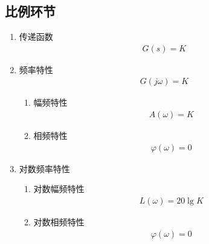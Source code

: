 \subsection{比例环节}
\begin{enumerate}[1.]
	\item 传递函数
	\vspace*{-0.5em}
	\begin{align}
		G(s) = K
	\end{align}
	\vspace*{-3em}
	
	\item 频率特性
	\vspace*{-0.5em}
	\begin{align}
		G(j\omega) = K
	\end{align}
	\vspace*{-3em}
	\begin{enumerate}[(1) ]
		\item 幅频特性
		\vspace*{-0.5em}
		\begin{align}
			A(\omega) = K
		\end{align}
		\vspace*{-3em}
		
		\item 相频特性
		\vspace*{-0.5em}
		\begin{align}
			\varphi(\omega) = 0
		\end{align}
		\vspace*{-3em}
	\end{enumerate}
		\item 对数频率特性
	\begin{enumerate}[(1) ]
		\item 对数幅频特性
		\vspace*{-0.5em}
		\begin{align}
			L(\omega) = 20 \lg K
		\end{align}
		\vspace*{-3em}
		\item 对数相频特性
		\vspace*{-0.5em}
		\begin{align}
			\varphi(\omega) = 0
		\end{align}
		\vspace*{-3em}
	\end{enumerate}
\end{enumerate}


